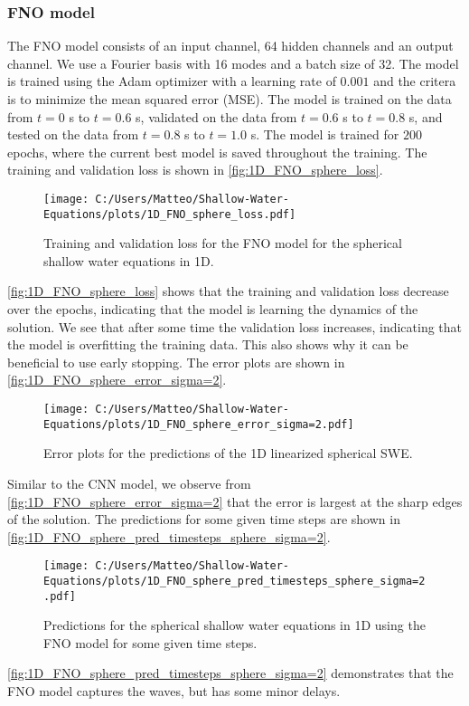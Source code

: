 \subsubsection*{FNO model}
The FNO model consists of an input channel, 64 hidden channels and an output channel. We use a Fourier basis with 16 modes and a batch size of 32.
The model is trained using the Adam optimizer with a learning rate of $0.001$ and the critera is to minimize the mean squared error (MSE).
The model is trained on the data from $t = 0$ s to $t = 0.6$ s, validated on the data from $t = 0.6$ s to $t = 0.8$ s, and tested on the data from $t = 0.8$ s to $t = 1.0$ s.
The model is trained for $200$ epochs, where the current best model is saved throughout the training.
The training and validation loss is shown in \autoref{fig:1D_FNO_sphere_loss}.
\begin{figure}[H]
    \centering
    \texttt{[image: C:/Users/Matteo/Shallow-Water-Equations/plots/1D\_FNO\_sphere\_loss.pdf]}
    \caption{Training and validation loss for the FNO model for the spherical shallow water equations in 1D.}\label{fig:1D_FNO_sphere_loss}
\end{figure}
\autoref{fig:1D_FNO_sphere_loss} shows that the training and validation loss decrease over the epochs, indicating that the model is learning the dynamics of the solution.
We see that after some time the validation loss increases, indicating that the model is overfitting the training data.
This also shows why it can be beneficial to use early stopping.
The error plots are shown in \autoref{fig:1D_FNO_sphere_error_sigma=2}.
\begin{figure}[H]
    \centering
    \texttt{[image: C:/Users/Matteo/Shallow-Water-Equations/plots/1D\_FNO\_sphere\_error\_sigma=2.pdf]}
    \caption{Error plots for the predictions of the 1D linearized spherical SWE.}\label{fig:1D_FNO_sphere_error_sigma=2}
\end{figure}
Similar to the CNN model, we observe from \autoref{fig:1D_FNO_sphere_error_sigma=2} that the error is largest at the sharp edges of the solution.
The predictions for some given time steps are shown in \autoref{fig:1D_FNO_sphere_pred_timesteps_sphere_sigma=2}.
\begin{figure}[H]
    \centering
    \texttt{[image: C:/Users/Matteo/Shallow-Water-Equations/plots/1D\_FNO\_sphere\_pred\_timesteps\_sphere\_sigma=2.pdf]}
    \caption{Predictions for the spherical shallow water equations in 1D using the FNO model for some given time steps.}\label{fig:1D_FNO_sphere_pred_timesteps_sphere_sigma=2}
\end{figure}
\autoref{fig:1D_FNO_sphere_pred_timesteps_sphere_sigma=2} demonstrates that the FNO model captures the waves, but has some minor delays.

